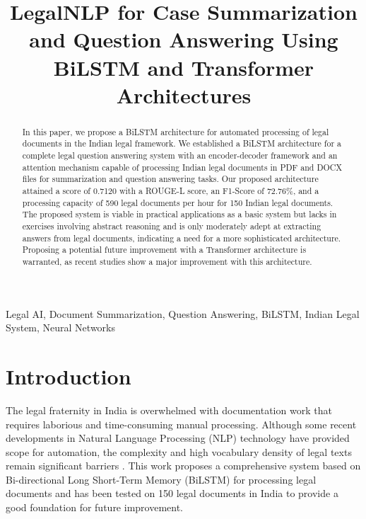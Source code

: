 \documentclass[conference]{IEEEtran}
\begin{document}
\title{LegalNLP for Case Summarization and Question Answering Using BiLSTM and Transformer Architectures}

\author{
}

\maketitle

\begin{abstract}
In this paper, we propose a BiLSTM architecture for automated processing of legal documents in the Indian legal framework. We established a BiLSTM architecture for a complete legal question answering system with an encoder-decoder framework and an attention mechanism capable of processing Indian legal documents in PDF and DOCX files for summarization and question answering tasks. Our proposed architecture attained a score of 0.7120 with a ROUGE-L score, an F1-Score of 72.76\%, and a processing capacity of 590 legal documents per hour for 150 Indian legal documents. The proposed system is viable in practical applications as a basic system but lacks in exercises involving abstract reasoning and is only moderately adept at extracting answers from legal documents, indicating a need for a more sophisticated architecture. Proposing a potential future improvement with a Transformer architecture is warranted, as recent studies show a major improvement with this architecture.
\end{abstract}

\begin{IEEEkeywords}
Legal AI, Document Summarization, Question Answering, BiLSTM, Indian Legal System, Neural Networks
\end{IEEEkeywords}

\section{Introduction}
The legal fraternity in India is overwhelmed with documentation work that requires laborious and time-consuming manual processing. Although some recent developments in Natural Language Processing (NLP) technology have provided scope for automation, the complexity and high vocabulary density of legal texts remain significant barriers \cite{akter2025legal}. This work proposes a comprehensive system based on Bi-directional Long Short-Term Memory (BiLSTM) for processing legal documents and has been tested on 150 legal documents in India to provide a good foundation for future improvement.
\end{document}
